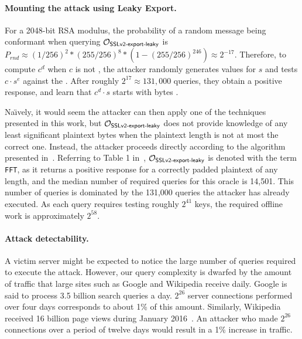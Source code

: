 \paragraph{Mounting the attack using Leaky Export.}
For a 2048-bit RSA modulus, the probability of a random message being conformant
when querying $\mathcal{O}_\textsf{SSLv2-export-leaky}$ is
$P_{rnd} \approx (1/256)^2 * (255/256)^{8} * (1 - (255/256)^{246}) \approx 2^{-17}$.
Therefore, to compute $c^d$ when $c$ is not \sslconform,
the attacker randomly generates values for $s$ and tests
$c \cdot s^{e}$ against the \tOracleSSLleaky.
After roughly $2^{17} \approx 131,000$ queries, they obtain a positive response,
and learn that $c^d \cdot s$ starts with bytes .

Na\"{\i}vely, it would seem the attacker can then apply one of the techniques
presented in this work, but $\mathcal{O}_\textsf{SSLv2-export-leaky}$ does not provide knowledge of
any least significant plaintext bytes when the plaintext length is not 
at most the correct one.
Instead, the attacker proceeds directly according to the algorithm presented
in~\cite{efficient-padding-oracle-2012}.
Referring to Table 1 in~\cite{efficient-padding-oracle-2012},
$\mathcal{O}_\textsf{SSLv2-export-leaky}$ is denoted with the term \texttt{FFT},
as it returns a positive response for a correctly padded plaintext of any length,
and the median number of required queries for this oracle is 14,501.
This number of queries is dominated by the 131,000 queries the attacker has already executed.
As each query requires testing roughly $2^{41}$ keys, the required offline work is
approximately $2^{58}$.

\ifext
\paragraph{Attack detectability.}

A victim server might be expected to notice the large number of queries required to execute the attack.  However, our query complexity is dwarfed by the amount of traffic that large sites such as Google and Wikipedia receive daily.  
Google is said to process 3.5 billion search queries a day.
$2^{26}$ server connections performed over four days corresponds to about 1\% of this amount.
Similarly, Wikipedia received 16 billion page views during January 2016~\cite{WikipediaStats}.
An attacker who made $2^{26}$ connections over a period of twelve days would result in a 1\% increase in traffic.
\fi

